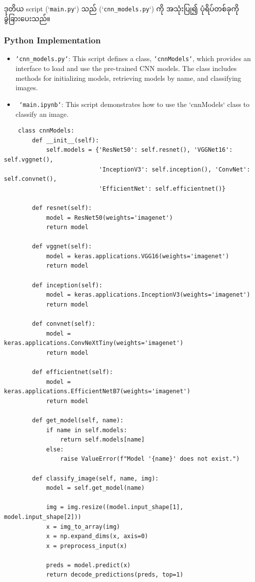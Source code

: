 ဒုတိယ script (`\texttt{main.py}`)  သည် (`\texttt{cnn\_models.py}`) ကို အသုံးပြု၍ ပုံရိပ်တစ်ခုကို ခွဲခြားပေးသည်။ 

\newpage
\subsubsection{Python Implementation}

\begin{itemize}[b]
\item{ \texttt{`cnn\_models.py`}}: This script defines a class, \texttt{`cnnModels`}, which provides an interface to load and use the pre-trained CNN models. The class includes methods for initializing models, retrieving models by name, and classifying images.

\item{\texttt{ `main.ipynb`}}: This script demonstrates how to use the `cnnModels` class to classify an image.
\end{itemize}

\begin{solution}
\begin{lstlisting}
    class cnnModels:
        def __init__(self):
            self.models = {'ResNet50': self.resnet(), 'VGGNet16': self.vggnet(), 
                           'InceptionV3': self.inception(), 'ConvNet': self.convnet(), 
                           'EfficientNet': self.efficientnet()}
    
        def resnet(self):       
            model = ResNet50(weights='imagenet')
            return model
        
        def vggnet(self):
            model = keras.applications.VGG16(weights='imagenet')
            return model
        
        def inception(self):
            model = keras.applications.InceptionV3(weights='imagenet')
            return model
        
        def convnet(self):
            model = keras.applications.ConvNeXtTiny(weights='imagenet')
            return model       
        
        def efficientnet(self):
            model = keras.applications.EfficientNetB7(weights='imagenet')
            return model
    
        def get_model(self, name):
            if name in self.models:
                return self.models[name]
            else:
                raise ValueError(f"Model '{name}' does not exist.")            
            
        def classify_image(self, name, img):
            model = self.get_model(name)      
            
            img = img.resize((model.input_shape[1], model.input_shape[2]))  
            x = img_to_array(img)
            x = np.expand_dims(x, axis=0)
            x = preprocess_input(x)
            
            preds = model.predict(x)
            return decode_predictions(preds, top=1)

\end{lstlisting}  
\end{solution}


